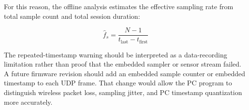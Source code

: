 For this reason, the offline analysis estimates the effective sampling rate from total sample count and total session duration:

\begin{equation}
\hat{f}_s=\frac{N-1}{t_{\mathrm{last}}-t_{\mathrm{first}}}
\label{eq:fs_appendix}
\end{equation}

The repeated-timestamp warning should be interpreted as a data-recording limitation rather than proof that the embedded sampler or sensor stream failed. A future firmware revision should add an embedded sample counter or embedded timestamp to each UDP frame. That change would allow the PC program to distinguish wireless packet loss, sampling jitter, and PC timestamp quantization more accurately.
